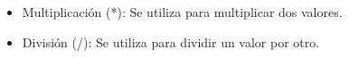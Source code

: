 \begin{itemize}
    \item Multiplicación (*): Se utiliza para multiplicar dos valores.
    \begin{figure}[h]
      \centering
    \end{figure}
    \newpage
    \item División (/): Se utiliza para dividir un valor por otro.
    \begin{figure}[h]
      \centering
    \end{figure}


\end{itemize}
